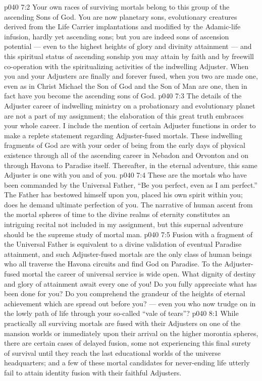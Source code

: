 \vs p040 7:2 Your own races of surviving mortals belong to this group of the ascending Sons of God. You are now planetary sons, evolutionary creatures derived from the Life Carrier implantations and modified by the Adamic\hyp{}life infusion, hardly yet ascending sons; but you are indeed sons of ascension potential --- even to the highest heights of glory and divinity attainment --- and this spiritual status of ascending sonship you may attain by faith and by freewill co\hyp{}operation with the spiritualizing activities of the indwelling Adjuster. When you and your Adjusters are finally and forever fused, when you two are made one, even as in Christ Michael the Son of God and the Son of Man are one, then in fact have you become the ascending sons of God.
\vs p040 7:3 The details of the Adjuster career of indwelling ministry on a probationary and evolutionary planet are not a part of my assignment; the elaboration of this great truth embraces your whole career. I include the mention of certain Adjuster functions in order to make a replete statement regarding Adjuster\hyp{}fused mortals. These indwelling fragments of God are with your order of being from the early days of physical existence through all of the ascending career in Nebadon and Orvonton and on through Havona to Paradise itself. Thereafter, in the eternal adventure, this same Adjuster is one with you and of you.
\vs p040 7:4 These are the mortals who have been commanded by the Universal Father, “Be you perfect, even as I am perfect.” The Father has bestowed himself upon you, placed his own spirit within you;  does he demand ultimate perfection of you. The narrative of human ascent from the mortal spheres of time to the divine realms of eternity constitutes an intriguing recital not included in my assignment, but this supernal adventure should be the supreme study of mortal man.
\vs p040 7:5 Fusion with a fragment of the Universal Father is equivalent to a divine validation of eventual Paradise attainment, and such Adjuster\hyp{}fused mortals are the only class of human beings who all traverse the Havona circuits and find God on Paradise. To the Adjuster\hyp{}fused mortal the career of universal service is wide open. What dignity of destiny and glory of attainment await every one of you! Do you fully appreciate what has been done for you? Do you comprehend the grandeur of the heights of eternal achievement which are spread out before you? --- even you who now trudge on in the lowly path of life through your so\hyp{}called “vale of tears”?
\vs p040 8:1 While practically all surviving mortals are fused with their Adjusters on one of the mansion worlds or immediately upon their arrival on the higher morontia spheres, there are certain cases of delayed fusion, some not experiencing this final surety of survival until they reach the last educational worlds of the universe headquarters; and a few of these mortal candidates for never\hyp{}ending life utterly fail to attain identity fusion with their faithful Adjusters.
